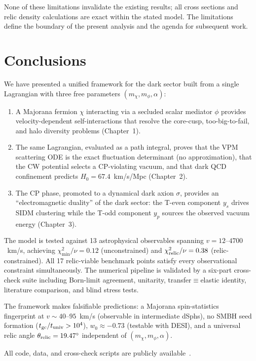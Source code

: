 None of these limitations invalidate the existing results; all cross sections
and relic density calculations are exact within the stated model. The
limitations define the boundary of the present analysis and the agenda for
subsequent work.


\section{Conclusions}
\label{disc:conclusions}

We have presented a unified framework for the dark sector built from a single
Lagrangian with three free parameters $(m_\chi, m_\phi, \alpha)$:

\begin{enumerate}
\item A Majorana fermion $\chi$ interacting via a secluded scalar mediator $\phi$
      provides velocity-dependent self-interactions that resolve the core-cusp,
      too-big-to-fail, and halo diversity problems (Chapter~1).

\item The same Lagrangian, evaluated as a path integral, proves that the VPM
      scattering ODE is the exact fluctuation determinant (no approximation),
      that the CW potential selects a CP-violating vacuum, and that dark QCD
      confinement predicts $H_0 = 67.4$~km/s/Mpc (Chapter~2).

\item The CP phase, promoted to a dynamical dark axion $\sigma$, provides an
      ``electromagnetic duality'' of the dark sector: the T-even component
      $y_s$ drives SIDM clustering while the T-odd component $y_p$ sources
      the observed vacuum energy (Chapter~3).
\end{enumerate}

The model is tested against 13 astrophysical observables spanning $v = 12$--$4700$~km/s,
achieving $\chi^2_{\min}/\nu = 0.12$ (unconstrained) and $\chi^2_{\rm relic}/\nu = 0.38$
(relic-constrained). All 17 relic-viable benchmark points satisfy every observational
constraint simultaneously. The numerical pipeline is validated by a six-part cross-check
suite including Born-limit agreement, unitarity, transfer$\equiv$elastic identity,
literature comparison, and blind stress tests.

The framework makes falsifiable predictions: a Majorana spin-statistics fingerprint
at $v \sim 40$--$95$~km/s (observable in intermediate dSphs), no SMBH seed formation
($t_{\rm gc}/t_{\rm univ} > 10^4$), $w_0 \approx -0.73$ (testable with DESI),
and a universal relic angle $\theta_{\rm relic} = 19.47^\circ$ independent of
$(m_\chi, m_\phi, \alpha)$.

All code, data, and cross-check scripts are publicly available~\cite{SIDMcode2026}.
